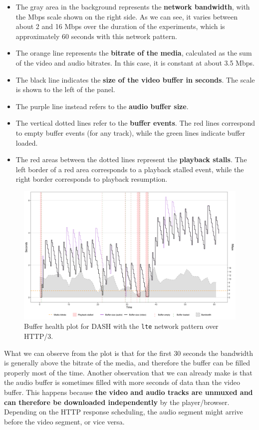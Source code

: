 \begin{itemize}
    \item The gray area in the background represents the \textbf{network bandwidth}, with the Mbps scale shown on the right side. As we can see, it varies between about 2 and 16 Mbps over the duration of the experiments, which is approximately 60 seconds with this network pattern.
    \item The orange line represents the \textbf{bitrate of the media}, calculated as the sum of the video and audio bitrates. In this case, it is constant at about 3.5 Mbps.
    \item The black line indicates the \textbf{size of the video buffer in seconds}. The scale is shown to the left of the panel.
    \item The purple line instead refers to the \textbf{audio buffer size}.
    \item The vertical dotted lines refer to the \textbf{buffer events}. The red lines correspond to empty buffer events (for any track), while the green lines indicate buffer loaded.
    \item The red areas between the dotted lines represent the \textbf{playback stalls}. The left border of a red area corresponds to a playback stalled event, while the right border corresponds to playback resumption.
\end{itemize}

\begin{figure}[h]
    \centering
    \includegraphics[width=\textwidth]{res/eval_nonabr_lte_h3.png}
    \caption{Buffer health plot for DASH with the \texttt{lte} network pattern over HTTP/3.}
    \label{fig:eval_nonabr_lte_h3}
\end{figure}

What we can observe from the plot is that for the first 30 seconds the bandwidth is generally above the bitrate of the media, and therefore the buffer can be filled properly most of the time. Another observation that we can already make is that the audio buffer is sometimes filled with more seconds of data than the video buffer. This happens because \textbf{the video and audio tracks are unmuxed and can therefore be downloaded independently} by the player/browser. Depending on the HTTP response scheduling, the audio segment might arrive before the video segment, or vice versa.

